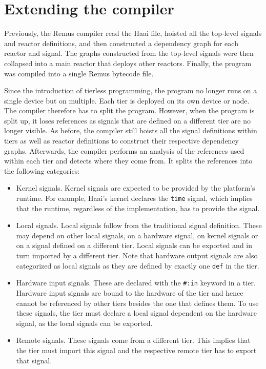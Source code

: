 \documentclass[a4paper]{book}
\begin{document}
\section{Extending the compiler}
\label{sec:extending-the-compiler}
Previously, the Remus compiler read the Haai file, hoisted all the top-level signals and
reactor definitions, and then constructed a dependency graph for each reactor and
signal. The graphs constructed from the top-level signals were then collapsed
into a main reactor that deploys other reactors. Finally, the program was compiled
into a single Remus bytecode file.
\par
Since the introduction of tierless programming, the program no longer runs on a
single device but on multiple. Each tier is deployed on its own device or node.
The compiler therefore has to split the program. However, when the program is
split up, it loses references as signals that are defined on a different
tier are no longer visible. As before, the compiler still hoists all the
signal definitions within tiers as well as reactor definitions to construct their
respective dependency graphs. Afterwards, the compiler performs an
analysis of the references used within each tier and detects where they come
from. It splits the references into the following categories:
\begin{itemize}
    \item Kernel signals. Kernel signals are expected to be provided by the
        platform's runtime. For example, Haai's kernel declares the
        \texttt{time} signal, which implies that the runtime, regardless of the
        implementation, has to provide the signal.
    \item Local signals. Local signals follow from the traditional signal
        definition. These may depend on other local signals, on a
        hardware signal, on kernel signals or on a signal defined on a different tier. Local
        signals can be exported and in turn imported by a different tier. Note
        that hardware output signals are also categorized as local signals as
        they are defined by exactly one \texttt{def} in the tier.
    \item Hardware input signals. These are declared with the \texttt{\#:in}
        keyword in a tier. Hardware input signals are bound to the hardware of the
        tier and hence cannot be referenced by other tiers besides the one that
        defines them. To use these signals, the tier must declare a local
        signal dependent on the hardware signal, as the local signals can be exported.
    \item Remote signals. These signals come from a different tier. This implies
        that the tier must import this signal and the respective remote tier has
        to export that signal.
\end{itemize}
\end{document}
